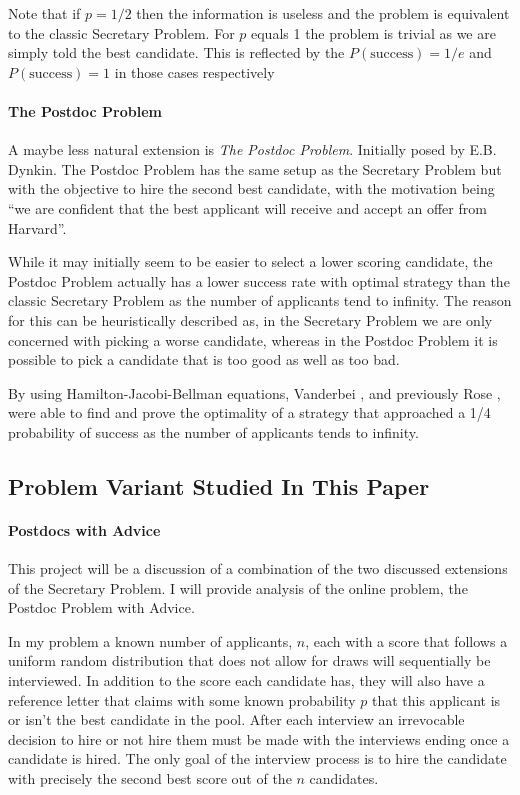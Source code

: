 \documentclass[a4paper,11pt]{article}
\begin{document}
Note that if $p = 1/2$ then the information is useless and the problem is equivalent to the classic Secretary Problem. For $p$ equals 1 the problem is trivial as we are simply told the best candidate. This is reflected by the $P(\text{success}) = 1/e$ and $P(\text{success}) = 1$ in those cases respectively

\paragraph{The Postdoc Problem}

A maybe less natural extension is \textit{The Postdoc Problem}. Initially posed by E.B. Dynkin. The Postdoc Problem has the same setup as the Secretary Problem but with the objective to hire the second best candidate, with the motivation being ``we are confident that the best applicant will receive and accept an offer from Harvard''.

While it may initially seem to be easier to select a lower scoring candidate, the Postdoc Problem actually has a lower success rate with optimal strategy than the classic Secretary Problem as the number of applicants tend to infinity. The reason for this can be heuristically described as, in the Secretary Problem we are only concerned with picking a worse candidate, whereas in the Postdoc Problem it is possible to pick a candidate that is too good as well as too bad.

By using Hamilton-Jacobi-Bellman equations, Vanderbei \cite{vanderbei2011postdoc}, and previously Rose \cite{Rose}, were able to find and prove the optimality of a strategy that approached a 1/4 probability of success as the number of applicants tends to infinity. 

\subsection{Problem Variant Studied In This Paper} 

\paragraph{Postdocs with Advice}

This project will be a discussion of a combination of the two discussed extensions of the Secretary Problem. I will provide analysis of the online problem, the Postdoc Problem with Advice. 

In my problem a known number of applicants, $n$,  each with a score that follows a uniform random distribution that does not allow for draws will sequentially be interviewed. In addition to the score each candidate has, they will also have a reference letter that claims with some known probability $p$ that this applicant is or isn't the best candidate in the pool. After each interview an irrevocable decision to hire or not hire them must be made with the interviews ending once a candidate is hired. The only goal of the interview process is to hire the candidate with precisely the second best score out of the $n$ candidates.
\end{document}
